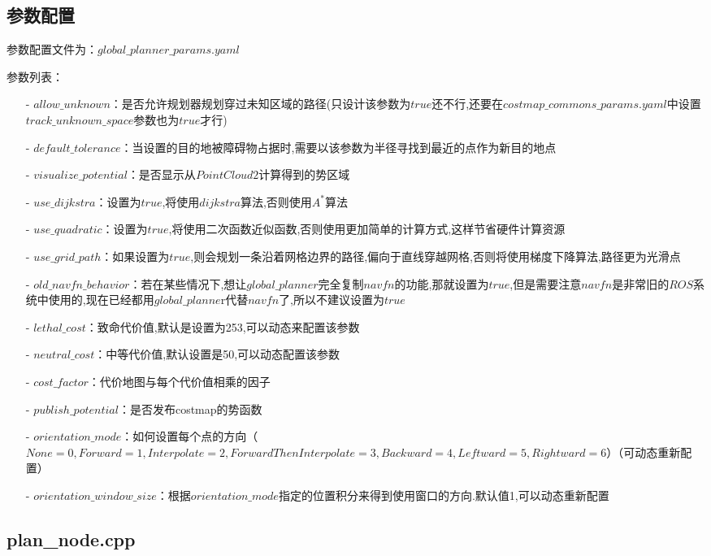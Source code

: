 \documentclass[9pt, oneside]{book}
\begin{document}
\subsection{参数配置}

参数配置文件为：$global\_planner\_params.yaml$

参数列表：

\begin{itemize}
    \item [-] $allow\_unknown$：是否允许规划器规划穿过未知区域的路径(只设计该参数为$true$还不行,还要在$costmap\_commons\_params.yaml$中设置$track\_unknown\_space$参数也为$true$才行)
    \item [-] $default\_tolerance$：当设置的目的地被障碍物占据时,需要以该参数为半径寻找到最近的点作为新目的地点
    \item [-] $visualize\_potential$：是否显示从$PointCloud2$计算得到的势区域
    \item [-] $use\_dijkstra$：设置为$true$,将使用$dijkstra$算法,否则使用$A^*$算法
    \item [-] $use\_quadratic$：设置为$true$,将使用二次函数近似函数,否则使用更加简单的计算方式,这样节省硬件计算资源
    \item [-] $use\_grid\_path$：如果设置为$true$,则会规划一条沿着网格边界的路径,偏向于直线穿越网格,否则将使用梯度下降算法,路径更为光滑点
    \item [-] $old\_navfn\_behavior$：若在某些情况下,想让$global\_planner$完全复制$navfn$的功能,那就设置为$true$,但是需要注意$navfn$是非常旧的$ROS$系统中使用的,现在已经都用$global\_planne$r代替$navfn$了,所以不建议设置为$true$
    \item [-] $lethal\_cost$：致命代价值,默认是设置为253,可以动态来配置该参数
    \item [-] $neutral\_cost$：中等代价值,默认设置是50,可以动态配置该参数
    \item [-] $cost\_factor$：代价地图与每个代价值相乘的因子
    \item [-] $publish\_potential$：是否发布costmap的势函数
    \item [-] $orientation\_mode$：如何设置每个点的方向（$None = 0,Forward = 1,Interpolate = 2,ForwardThenInterpolate = 3,Backward = 4,Leftward = 5,Rightward = 6$）（可动态重新配置）
    \item [-] $orientation\_window\_size$：根据$orientation\_mode$指定的位置积分来得到使用窗口的方向.默认值1,可以动态重新配置
\end{itemize}

\subsection{plan\_node.cpp}
\end{document}
